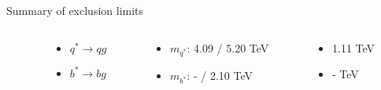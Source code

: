 \documentclass[8pt]{beamer}
\begin{document}
\begin{frame}{\large Summary of exclusion limits}
 \vspace{0.2cm}
 
   \begin{columns}
  \begin{column}{3cm}
  \end{column}
  \begin{column}{3cm}
    \begin{itemize}
     \item[\SixteenStarLight] $q^{*} \to qg$
     \item[\SixteenStarLight] $b^{*} \to bg$
    \end{itemize}
  \end{column}
  \begin{column}{3.3cm}
    \begin{itemize}
     \item[] $m_{q^{*}}$: 4.09 / 5.20 TeV
     \item[] $m_{b^{*}}$: -    / 2.10 TeV
    \end{itemize}
  \end{column}
  \begin{column}{2.7cm}
    \begin{itemize}
     \item[] 1.11 TeV
     \item[] - TeV
    \end{itemize}
  \end{column}
 \end{columns}
 
 \vspace{0.2cm}
 

\end{frame}
\end{document}
